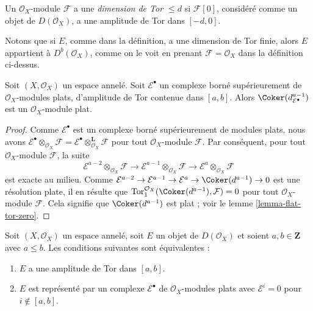 {\begin{definition}
\begin{enumerate}
\end{enumerate}

Un $\mathcal{O}_X$-module $\mathcal{F}$ a une {\it dimension de Tor $\leq d$}
si $\mathcal{F}[0]$, considéré comme un objet de $D(\mathcal{O}_X)$, a une amplitude de Tor dans $[-d, 0]$.

\end{definition}

\noindent
Notons que si $E$, comme dans la définition, a une dimension de Tor finie, alors $E$ appartient à $D^b(\mathcal{O}_X)$, comme on le voit en prenant $\mathcal{F} = \mathcal{O}_X$ dans la définition ci-dessus.

\begin{lemma}

\label{lemma-last-one-flat}
Soit $(X, \mathcal{O}_X)$ un espace annelé. Soit $\mathcal{E}^\bullet$ un complexe borné supérieurement de $\mathcal{O}_X$-modules plats, d'amplitude de Tor contenue dans $[a, b]$. Alors $\Coker(d_{\mathcal{E}^\bullet}^{a - 1})$ est un $\mathcal{O}_X$-module plat.
\end{lemma}

\begin{proof}

Comme $\mathcal{E}^\bullet$ est un complexe borné supérieurement de modules plats, nous avons
$\mathcal{E}^\bullet \otimes_{\mathcal{O}_X} \mathcal{F} =
\mathcal{E}^\bullet \otimes_{\mathcal{O}_X}^{\mathbf{L}} \mathcal{F}$
pour tout $\mathcal{O}_X$-module $\mathcal{F}$. Par conséquent, pour tout $\mathcal{O}_X$-module $\mathcal{F}$, la suite
$$
\mathcal{E}^{a - 2} \otimes_{\mathcal{O}_X} \mathcal{F} \to
\mathcal{E}^{a - 1} \otimes_{\mathcal{O}_X} \mathcal{F} \to
\mathcal{E}^a \otimes_{\mathcal{O}_X} \mathcal{F}
$$
est exacte au milieu. Comme
$\mathcal{E}^{a - 2} \to \mathcal{E}^{a - 1} \to \mathcal{E}^a \to
\Coker(d^{a - 1}) \to 0$
est une résolution plate, il en résulte que
$\text{Tor}_1^{\mathcal{O}_X}(\Coker(d^{a - 1}), \mathcal{F}) = 0$
pour tout $\mathcal{O}_X$-module $\mathcal{F}$. Cela signifie que
$\Coker(d^{a - 1})$ est plat ; voir le lemme \ref{lemma-flat-tor-zero}.

\end{proof}

\begin{lemma}

\label{lemma-tor-amplitude}
Soit $(X, \mathcal{O}_X)$ un espace annelé, soit $E$ un objet de $D(\mathcal{O}_X)$ et soient $a, b \in \mathbf{Z}$ avec $a \leq b$. Les conditions suivantes sont équivalentes :
\begin{enumerate}
\item $E$ a une amplitude de Tor dans $[a, b]$.
\item $E$ est représenté par un complexe $\mathcal{E}^\bullet$ de $\mathcal{O}_X$-modules plats avec $\mathcal{E}^i = 0$ pour $i \not \in [a, b]$.
\end{enumerate}


\end{lemma}}
